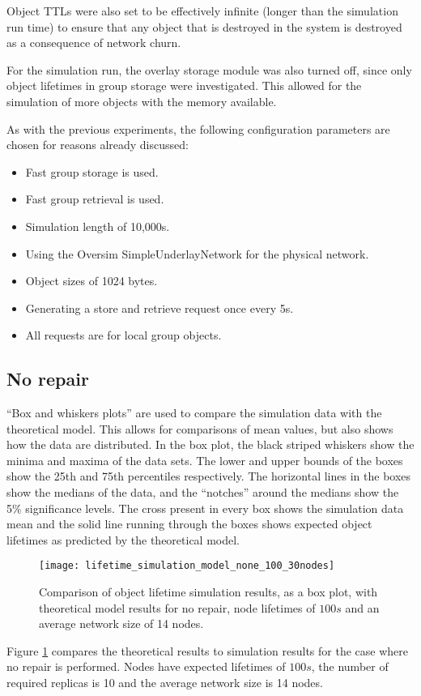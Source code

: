 Object TTLs were also set to be effectively infinite (longer than the simulation run time) to ensure that any object that is destroyed in the system is destroyed as a consequence of network churn.

For the simulation run, the overlay storage module was also turned off, since only object lifetimes in group storage were investigated. This allowed for the simulation of more objects with the memory available.

As with the previous experiments, the following configuration parameters are chosen for reasons already discussed:
%
\begin{itemize}
\item Fast group storage is used.
\item Fast group retrieval is used.
\item Simulation length of 10,000s.
\item Using the Oversim SimpleUnderlayNetwork for the physical network.
\item Object sizes of 1024 bytes.
\item Generating a store and retrieve request once every 5s.
\item All requests are for local group objects.
\end{itemize}

\subsection{No repair}

``Box and whiskers plots'' are used to compare the simulation data with the theoretical model. This allows for comparisons of mean values, but also shows how the data are distributed. In the box plot, the black striped whiskers show the minima and maxima of the data sets. The lower and upper bounds of the boxes show the 25th and 75th percentiles respectively. The horizontal lines in the boxes show the medians of the data, and the ``notches'' around the medians show the 5\% significance levels. The cross present in every box shows the simulation data mean and the solid line running through the boxes shows expected object lifetimes as predicted by the theoretical model.

\begin{figure}[htbp]
 \centering
 \texttt{[image: lifetime\_simulation\_model\_none\_100\_30nodes]}
 \caption{Comparison of object lifetime simulation results, as a box plot, with theoretical model results for no repair, node lifetimes of $100s$ and an average network size of 14 nodes.}
 \label{fig_lifetime_simulation_model_none_30_100}
\end{figure}
%
Figure \ref{fig_lifetime_simulation_model_none_30_100} compares the theoretical results to simulation results for the case where no repair is performed. Nodes have expected lifetimes of $100s$, the number of required replicas is 10 and the average network size is 14 nodes.

